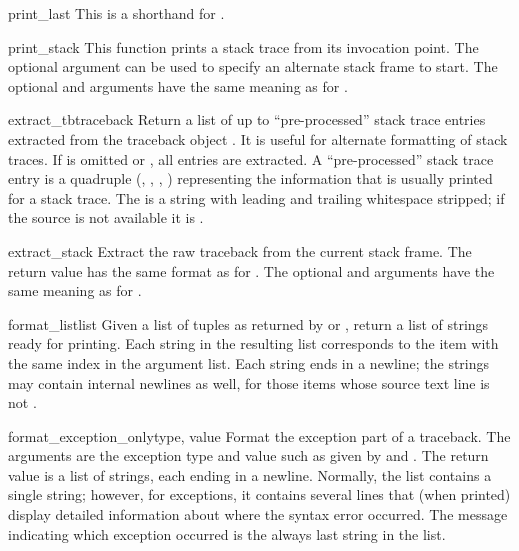 \begin{funcdesc}{print_last}{}
This is a shorthand for .
\end{funcdesc}

\begin{funcdesc}{print_stack}{}
This function prints a stack trace from its invocation point.  The
optional  argument can be used to specify an alternate stack
frame to start.  The optional  and  arguments have the
same meaning as for .
\end{funcdesc}

\begin{funcdesc}{extract_tb}{traceback}
Return a list of up to  ``pre-processed'' stack trace
entries extracted from the traceback object .  It is
useful for alternate formatting of stack traces.  If  is
omitted or , all entries are extracted.  A
``pre-processed'' stack trace entry is a quadruple (,
, , ) representing
the information that is usually printed for a stack trace.  The
 is a string with leading and trailing whitespace
stripped; if the source is not available it is .
\end{funcdesc}

\begin{funcdesc}{extract_stack}{}
Extract the raw traceback from the current stack frame.  The return
value has the same format as for .  The
optional  and  arguments have the same meaning as
for .
\end{funcdesc}

\begin{funcdesc}{format_list}{list}
Given a list of tuples as returned by  or
, return a list of strings ready for
printing.  Each string in the resulting list corresponds to the item
with the same index in the argument list.  Each string ends in a
newline; the strings may contain internal newlines as well, for those
items whose source text line is not .
\end{funcdesc}

\begin{funcdesc}{format_exception_only}{type, value}
Format the exception part of a traceback.  The arguments are the
exception type and value such as given by  and
.  The return value is a list of strings, each
ending in a newline.  Normally, the list contains a single string;
however, for  exceptions, it contains several
lines that (when printed) display detailed information about where the
syntax error occurred.  The message indicating which exception
occurred is the always last string in the list.
\end{funcdesc}

